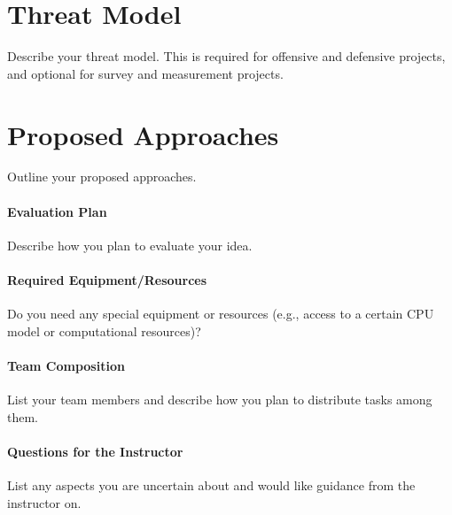 \section{Threat Model}
\label{sec:threat}

Describe your threat model.
This is required for offensive and defensive projects, and optional for survey and measurement projects.

\section{Proposed Approaches}
\label{sec:approach}

Outline your proposed approaches.

\paragraph{Evaluation Plan}
Describe how you plan to evaluate your idea.

\paragraph{Required Equipment/Resources}
Do you need any special equipment or resources (e.g., access to a certain CPU model or computational resources)?

\paragraph{Team Composition}
List your team members and describe how you plan to distribute tasks among them.

\paragraph{Questions for the Instructor}
List any aspects you are uncertain about and would like guidance from the instructor on.
